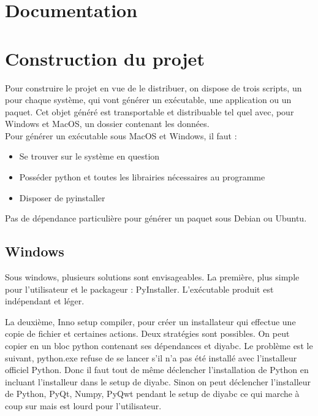 \documentclass[12pt,a4paper]{article}
\begin{document}
\section{Documentation}

\section{Construction du projet}

    Pour construire le projet en vue de le distribuer, on dispose de trois
    scripts, un pour chaque système, qui vont générer un exécutable, une
    application ou un paquet. Cet objet généré est transportable et distribuable
    tel quel avec, pour Windows et MacOS, un dossier contenant les données.\\

    Pour générer un exécutable sous MacOS et Windows, il faut : 
    \begin{itemize}
    \item Se trouver sur le système en question
    \item Posséder python et toutes les librairies nécessaires au programme
    \item Disposer de pyinstaller\\
    \end{itemize}

    Pas de dépendance particulière pour générer un paquet sous Debian ou Ubuntu.

    
    \subsection{Windows}
        Sous windows, plusieurs solutions sont envisageables. La première, plus
        simple pour l'utilisateur et le packageur : PyInstaller. L'ex\'ecutable
        produit est ind\'ependant et l\'eger. \newline

        La deuxième, Inno setup compiler, pour cr\'eer un installateur qui
        effectue une copie de fichier et certaines actions.  Deux strat\'egies
        sont possibles. On peut copier en un bloc python contenant ses
        d\'ependances et diyabc. Le problème est le suivant, python.exe refuse
        de se lancer s'il n'a pas \'et\'e install\'e avec l'installeur officiel
        Python. Donc il faut tout de même d\'eclencher l'installation de Python
        en incluant l'installeur dans le setup de diyabc. Sinon on peut
        d\'eclencher l'installeur de Python, PyQt, Numpy, PyQwt pendant le setup
        de diyabc ce qui marche à coup sur mais est lourd pour
        l'utilisateur.\newline
        
\end{document}
